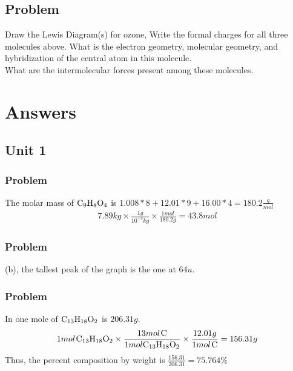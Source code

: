 \documentclass{article}
\begin{document}
\subsection*{Problem \countThis}
Draw the Lewis Diagram(s) for ozone, 
\ProblemSet
Write the formal charges for all three molecules above.
\ProblemSet
What is the electron geometry, molecular geometry, and hybridization of the central atom in this molecule. \\ 
\ProblemSet
What are the intermolecular forces present among these molecules. \\ 



\setcounter{yayCounter}{1}
\newpage
\section{Answers}
\subsection{Unit 1}
\subsubsection*{Problem \countThis}
The molar mass of \(\ce{C_9H_8O_4}\) is \(1.008*8 + 12.01*9 + 16.00*4 = 180.2 \frac{g}{mol}\)
\begin{equation}
\begin{aligned}
    7.89kg \times \frac{1g}{10^{-3}kg} \times \frac{1mol}{180.2g} = 43.8mol
\end{aligned}
\end{equation}
\subsubsection*{Problem \countThis}
(b), the tallest peak of the graph is the one at \(64u\). 
\subsubsection*{Problem \countThis}
In one mole of \(\ce{C_{13}H_{18}O_2}\) is \(206.31g\).
\begin{equation}
\begin{aligned}
    1mol\hspace{0.1em}\ce{C_{13}H_{18}O_2} \times \frac{13mol\hspace{0.1em}\ce{C}}{1mol\ce{C_{13}H_{18}O_2}} \times \frac{12.01g}{1mol\hspace{0.1em}\ce{C}} = 156.31g
\end{aligned}
\end{equation}
Thus, the percent composition by weight is \(\frac{156.31}{206.31} = 75.764\%\)
\end{document}
